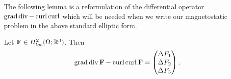 \documentclass[../master_thesis.tex]{subfiles}
\begin{document}
The following lemma is a reformulation of the differential operator 
$\operatorname{grad} \operatorname{div} \allowbreak- \operatorname{curl} \operatorname{curl}$ which will be needed when we write our 
magnetostatic problem in the above standard elliptic form.

\begin{lemma}\label{lem:graddiv_curlcurl_equals_componentwise_laplacian}
    Let $\mathbf{F} \in H^2_{loc}(\Omega;\mathbb{R}^3)$. Then 
    \begin{align*}
        \operatorname{grad} \operatorname{div} \mathbf{F} - \operatorname{curl} \operatorname{curl} \mathbf{F} 
        = \begin{pmatrix} \Delta F_1 \\ \Delta F_2 
            \\ \Delta F_3  \end{pmatrix}.
    \end{align*}
\end{lemma}
\end{document}
